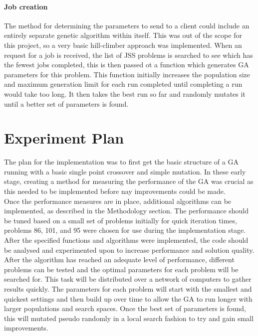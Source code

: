 \documentclass[14pt]{acmsiggraph}
\begin{document}
	\paragraph{Job creation}
	The method for determining the parameters to send to a client could include an entirely separate genetic algorithm within itself. This was out of the scope for this project, so a very basic hill-climber approach was implemented. When an request for a job is received, the list of JSS problems is searched to see which has the fewest jobs completed, this is then passed ot a function which generates GA parameters for this problem. This function initially increases the population size and maximum generation limit for each run completed until completing a run would take too long. It then takes the best run so far and randomly mutates it until a better set of parameters is found.
	
	\section{Experiment Plan}
	The plan for the implementation was to first get the basic structure of a GA running with a basic single point crossover and simple mutation. In these early stage, creating a method for measuring the performance of the GA was crucial as this needed to be implemented before nay improvements could be made. \\
	Once the performance measures are in place, additional algorithms can be implemented, as described in the Methodology section. The performance should be tuned based on a small set of problems initially for quick iteration times, problems 86, 101, and 95 were chosen for use during the implementation stage.\\
	After the specified functions and algorithms were implemented, the code should be analysed and experimented upon to increase performance and solution quality.\\
	After the algorithm has reached an adequate level of performance, different problems can be tested and the optimal parameters for each problem will be searched for. This task will be distributed over a network of computers to gather results quickly. The parameters for each problem will start with the smallest and quickest settings and then build up over time to allow the GA to run longer with larger populations and search spaces. Once the best set of parameters is found, this will mutated pseudo randomly in a local search fashion to try and gain small improvements.
	
\end{document}
